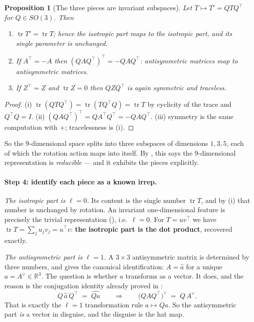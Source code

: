 \documentclass[11pt,a4paper]{report}
\newtheorem{proposition}[proposition]{Proposition}
\theoremstyle{definition}
\theoremstyle{remark}
\DeclareMathOperator{\tr}{tr}
\newcommand{\RR}{\mathbb R}
\begin{document}
\begin{proposition}[The three pieces are invariant subspaces]
\label{prop:three-pieces-invariant}
Let $T\mapsto T'=QTQ^\top$ for $Q\in SO(3)$. Then
\begin{enumerate}[nosep,label=(\roman*)]
\item $\tr T' = \tr T$; hence the isotropic part maps to the isotropic part,
and its single parameter is unchanged.
\item If $A^\top=-A$ then $(QAQ^\top)^\top = -QAQ^\top$: antisymmetric
matrices map to antisymmetric matrices.
\item If $Z^\top=Z$ and $\tr Z=0$ then $QZQ^\top$ is again symmetric and
traceless.
\end{enumerate}
\end{proposition}

\begin{proof}
(i) $\tr(QTQ^\top)=\tr(TQ^\top Q)=\tr T$ by cyclicity of the trace and
$Q^\top Q=I$. (ii) $(QAQ^\top)^\top = Q A^\top Q^\top = -QAQ^\top$. (iii)
symmetry is the same computation with $+$; tracelessness is (i).
\end{proof}

So the $9$-dimensional space splits into three subspaces of dimensions
$1,3,5$, each of which the rotation action maps into itself. By
, this says the $9$-dimensional representation is
\emph{reducible} --- and it exhibits the pieces explicitly.

\paragraph{Step 4: identify each piece as a known irrep.}

\emph{The isotropic part is $\ell=0$.} Its content is the single number
$\tr T$, and by (i) that number is unchanged by rotation. An invariant
one-dimensional feature is precisely the trivial representation
(), i.e.\ $\ell=0$. For $T=uv^\top$ we have
$\tr T=\sum_j u_jv_j = u^\top v$: \textbf{the isotropic part is the dot
product}, recovered exactly.

\emph{The antisymmetric part is $\ell=1$.} A $3\times3$ antisymmetric matrix
is determined by three numbers, and  gives the
canonical identification: $A=\widehat a$ for a unique $a=A^\vee\in\RR^3$. The
question is whether $a$ transforms as a vector. It does, and the reason is
the conjugation identity already proved in :
\[
Q\,\widehat a\,Q^\top \;=\; \widehat{Qa}
\qquad\Longrightarrow\qquad
\bigl(QAQ^\top\bigr)^\vee \;=\; Q\,A^\vee .
\]
That is exactly the $\ell=1$ transformation rule $a\mapsto Qa$. So the
antisymmetric part \emph{is} a vector in disguise, and the disguise is the
hat map.
\end{document}
